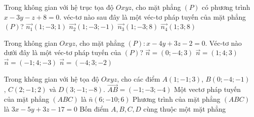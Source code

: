 %

\begin{ex}%
	Trong không gian với hệ trục tọa độ $Oxyz$, cho mặt phẳng $(P)$ có phương trình $x-3y-z+8=0$. véc-tơ nào sau đây là một véc-tơ pháp tuyến của mặt phẳng $(P)$?
	\choice
	{$\overrightarrow{n_1}(1;-3; 1)$}
	{\True $\overrightarrow{n_2}(1;-3;-1)$}
	{$\overrightarrow{n_3}(1;-3; 8)$}
	{$\overrightarrow{n_4}(1; 3; 8)$}
\end{ex}

\begin{ex}%
	Trong không gian $Oxyz$, cho mặt phẳng $(P)\colon x-4y+3z-2=0$. Véc-tơ nào dưới đây là một véc-tơ pháp tuyến của $(P)$?
	\choice
	{$\vec{n}=(0;-4; 3)$}
	{$\vec{n}=(1; 4; 3)$}
	{\True$\vec{n}=(-1; 4;-3)$}
	{$\vec{n}=(-4; 3;-2)$}
\end{ex}

\begin{ex}%
	Trong không gian với hệ tọa độ $Oxyz$, cho các điểm $A(1;-1; 3)$, $B(0;-4;-1)$, $ C(2;-1; 2)$ và $D(3;-1;-8)$.
	\choiceTF
	{\True $\overrightarrow{AB}=(-1;-3;-4)$}
	{\True Một vectơ pháp tuyến của mặt phẳng $(ABC)$ là $\bar{n}(6;-10; 6)$}
	{\True Phương trình của mặt phẳng $(ABC)$ là $3x-5y+3z-17=0$}
	{Bốn điểm $A, B, C, D$ cùng thuộc một mặt phẳng}
\end{ex}

